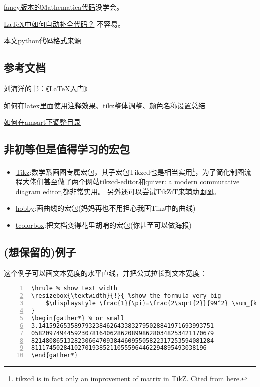 \documentclass[11pt]{amsart}
\begin{document}
   \href{https://tex.stackexchange.com/questions/84748/fanciest-way-to-include-mathematica-code-in-latex}{fancy版本的Mathematica代码}没学会。
           
\href{https://tex.stackexchange.com/questions/126241/autoindent-in-texmaker}{\LaTeX 中如何自动补全代码？} 不容易。

\href{https://tex.stackexchange.com/questions/235783/listings-recognize-numbers-and-1e-3}{本文python代码格式来源}

\subsection{参考文档}
刘海洋的书：《\LaTeX 入门》

\href{https://liam.page/2016/09/24/TikZ-comment-to-text/}{如何在latex里面使用注释效果}、\href{https://newbedev.com/how-of-to-change-font-size-for-every-nodes-in-tikzcd}{tikz整体调整}、\href{http://latexcolor.com/}{颜色名称设置总结}

\href{https://tex.stackexchange.com/questions/322268/table-of-contents-amsart}{如何在amsart下调整目录}
\subsection{非初等但是值得学习的宏包}
\begin{itemize}
\item \href{https://ctan.org/pkg/pgf}{Tikz}:数学系画图专属宏包，其子宏包Tikzcd也是相当实用\footnote{tikzcd is in fact only an improvement of matrix in TikZ. Cited from \href{https://tex.stackexchange.com/questions/484743/format-single-node-in-tikzcd}{here}.}，为了简化制图流程大佬们甚至做了两个网站\href{https://tikzcd.yichuanshen.de/}{tikzcd-editor}和\href{https://q.uiver.app/}{quiver: a modern commutative diagram editor},都非常实用。 另外还可以尝试\href{https://tikzit.github.io/}{TikZiT}来辅助画图。
\item \href{https://ctan.org/pkg/hobby}{hobby}:画曲线的宏包(妈妈再也不用担心我画Tikz中的曲线)
\item \href{https://ctan.org/pkg/tcolorbox}{tcolorbox}:把文档变得花里胡哨的宏包(你甚至可以做海报)
\end{itemize}
\subsection{(想保留的)例子}
这个例子可以画文本宽度的水平直线，并把公式拉长到文本宽度：
\begin{lstlisting}[numbers=left,numberstyle=\tiny,numbersep=10pt]
\hrule % show text width
\resizebox{\textwidth}{!}{ %show the formula very big
	$\displaystyle \frac{1}{\pi}=\frac{2\sqrt{2}}{99^2} \sum_{k=0}^{\infty} \frac{(4k)!}{k!^4}\frac{26390k+1103}{396^{4k}} $
}
\begin{gather*} % or small
3.1415926535897932384626433832795028841971693993751
058209749445923078164062862089986280348253421170679
821480865132823066470938446095505822317253594081284
8111745028410270193852110555964462294895493038196
\end{gather*}
\end{lstlisting}
\end{document}
